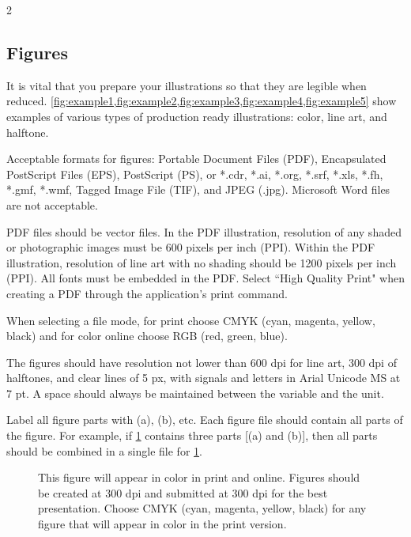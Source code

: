 \documentclass[fleqn]{2026SCGE}
\begin{document}
\begin{multicols}{2}
\subsection{Figures}
It is vital that you prepare your illustrations so that they are legible when reduced. \cref{fig:example1,fig:example2,fig:example3,fig:example4,fig:example5} show examples of various types of production ready illustrations: color, line art, and halftone.

Acceptable formats for figures: Portable Document Files (PDF), Encapsulated PostScript Files (EPS), PostScript (PS), or *.cdr, *.ai, *.org, *.srf, *.xls, *.fh, *.gmf, *.wmf, Tagged Image File (TIF), and JPEG (.jpg). Microsoft Word files are not acceptable.

PDF files should be vector files. In the PDF illustration, resolution of any shaded or photographic images must be 600 pixels per inch (PPI). Within the PDF illustration, resolution of line art with no shading should be 1200 pixels per inch (PPI). All fonts must be embedded in the PDF. Select ``High Quality Print" when creating a PDF through the application's print command.

When selecting a file mode, for print choose CMYK (cyan, magenta, yellow, black) and for color online choose RGB (red, green, blue).

The figures should have resolution not lower than 600 dpi for line art, 300 dpi of halftones, and clear lines of 5 px, with signals and letters in Arial Unicode MS at 7 pt. A space should always be maintained between the variable and the unit.

Label all figure parts with (a), (b), etc. Each figure file should contain all parts of the figure. For example, if \cref{fig:example1} contains three parts [(a) and (b)], then all parts should be combined in a single file for \cref{fig:example1}.

\begin{figure}[H]%
\centering
\caption{This figure will appear in color in print and online. Figures should be created at 300 dpi and submitted at 300 dpi for the best presentation. Choose CMYK (cyan, magenta, yellow, black) for any figure that will appear in color in the print version.} %
\label{fig:example1}%
\end{figure}



\end{multicols}
\end{document}
